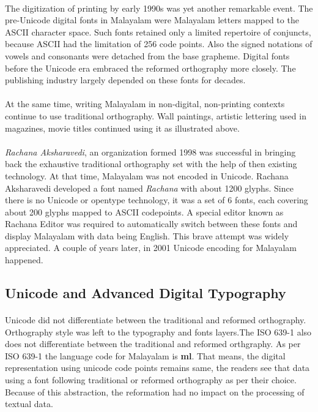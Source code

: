 \documentclass[10pt]{article}
\begin{document}
\paragraph{}
The digitization of printing by early 1990s was yet another remarkable event. The pre-Unicode digital fonts in Malayalam were Malayalam letters mapped to the ASCII character space. Such fonts retained only a limited repertoire of conjuncts, because ASCII had the limitation of 256 code points. Also the signed notations of vowels and consonants were detached from the base grapheme. Digital fonts before the Unicode era embraced the reformed orthography more closely. The publishing industry largely depended on these fonts for decades.

\paragraph{}
At the same time, writing Malayalam in non-digital, non-printing contexts continue to use traditional orthography. Wall paintings, artistic lettering used in magazines, movie titles continued using it as illustrated above.

\paragraph{}
\textit{Rachana Aksharavedi}, an organization formed 1998 was successful in bringing back the exhaustive traditional orthography set with the help of then existing technology. At that time, Malayalam was not encoded in Unicode. Rachana Aksharavedi developed a font named \textit{Rachana} with about 1200 glyphs. Since there is no Unicode or opentype technology, it was a set of 6 fonts, each covering about 200 glyphs mapped to ASCII codepoints. A special editor known as Rachana Editor was required to automatically switch between these fonts and display Malayalam with data being English. This brave attempt was widely appreciated. A couple of years later, in 2001 Unicode encoding for Malayalam happened.

\subsection{Unicode and Advanced Digital Typography}

\paragraph{}
Unicode did not differentiate between the traditional and reformed orthography. Orthography style was left to the typography and fonts layers.The ISO 639-1 also does not differentiate between the traditional and reformed orthgraphy\cite{thottingal}. As per ISO 639-1 the language code for Malayalam is \textbf{ml}. That means, the digital representation using unicode code points remains same, the readers see that data using a font following traditional or reformed orthography as per their choice. Because of this abstraction, the reformation had no impact on the processing of textual data.
\end{document}
